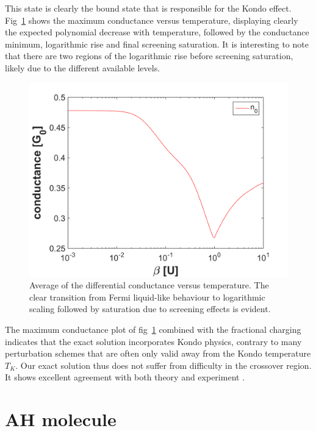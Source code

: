 \documentclass{article}
\begin{document}
\begin{multicols}{2}
        This state is clearly the bound state that is responsible for the Kondo effect. Fig~\ref{fig:conductance} shows the maximum conductance versus temperature, displaying clearly the expected polynomial decrease with temperature, followed by the conductance minimum, logarithmic rise and final screening saturation. It is interesting to note that there are two regions of the logarithmic rise before screening saturation, likely due to the different available levels.
        
        \begin{figure}[b]
            \centering
            \includegraphics[width=\textwidth]{figBigFont/conductancemax.png}
            \caption{\label{fig:conductance} Average of the differential conductance versus temperature. The clear transition from Fermi liquid-like behaviour to logarithmic scaling followed by saturation due to screening effects is evident.}
        \end{figure}
        
        The maximum conductance plot of fig~\ref{fig:conductance} combined with the fractional charging indicates that the exact solution incorporates Kondo physics, contrary to many perturbation schemes that are often only valid away from the Kondo temperature $T_K$. Our exact solution thus does not suffer from difficulty in the crossover region. It shows excellent agreement with both theory and experiment \cite{Sasaki2000}. 
         
    \section{AH molecule}\label{sec:ahmolecule}
        

\end{multicols}
\end{document}
